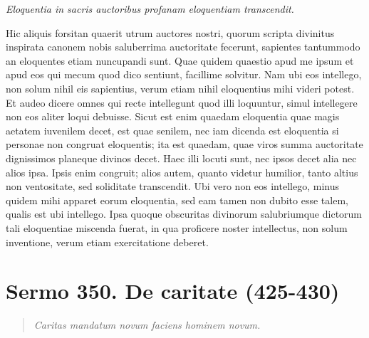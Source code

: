 \textit{Eloquentia in sacris auctoribus profanam eloquentiam transcendit.}

Hic aliquis forsitan quaerit utrum auctores nostri, quorum scripta divinitus inspirata canonem nobis saluberrima auctoritate fecerunt, sapientes tantummodo an eloquentes etiam nuncupandi sunt. Quae quidem quaestio apud me ipsum et apud eos qui mecum quod dico sentiunt, facillime solvitur. Nam ubi eos intellego, non solum nihil eis sapientius, verum etiam nihil eloquentius mihi videri potest. Et audeo dicere omnes qui recte intellegunt quod illi loquuntur, simul intellegere non eos aliter loqui debuisse. Sicut est enim quaedam eloquentia quae magis aetatem iuvenilem decet, est quae senilem, nec iam dicenda est eloquentia si personae non congruat eloquentis; ita est quaedam, quae viros summa auctoritate dignissimos planeque divinos decet. Haec illi locuti sunt, nec ipsos decet alia nec alios ipsa. Ipsis enim congruit; alios autem, quanto videtur humilior, tanto altius non ventositate, sed soliditate transcendit. Ubi vero non eos intellego, minus quidem mihi apparet eorum eloquentia, sed eam tamen non dubito esse talem, qualis est ubi intellego. Ipsa quoque obscuritas divinorum salubriumque dictorum tali eloquentiae miscenda fuerat, in qua proficere noster intellectus, non solum inventione, verum etiam exercitatione deberet.

\section*{Sermo 350. De caritate (425-430)}


\begin{quote}
\textit{Caritas mandatum novum faciens hominem novum.}
\end{quote}

